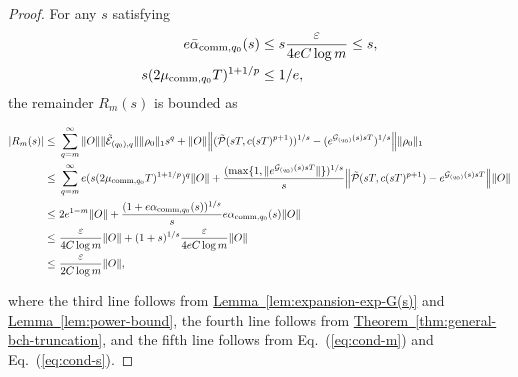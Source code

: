 \documentclass[aps,pra,reprint,groupedaddress,floatfix]{revtex4-2}
\newcommand{\eq}[1]{(\ref{eq:#1})}
\newcommand{\thm}[1]{\hyperref[thm:#1]{Theorem~\ref*{thm:#1}}}
\newcommand{\lem}[1]{\hyperref[lem:#1]{Lemma~\ref*{lem:#1}}}
\newcommand{\G}{\mathcal{G}}
\newcommand{\E}{\mathcal{E}}
\newcommand{\eps}{\varepsilon}
\newcommand{\mc}{\mathcal}
\begin{document}
\begin{proof}
   
    For any $s$ satisfying \begin{align}
    \label{eq:cond-s}
        e\bar\alpha_{\mathrm{comm},q_0}(s)
        &\le s\frac{\eps}{4eC \log m} \le s, \notag\\
        s(2\mu_{\mathrm{comm},q_0}T)^{1+1/p}
        &\le 1/e,
    \end{align} the remainder $R_m(s)$ is bounded as
    \begin{widetext}
    \begin{align*}
        |R_m(s)|\le ~&\sum_{q=m}^{\infty}\|O\|\|\tilde{\E}_{(q_0),q}\|\|\rho_0\|_1 s^q+\|O\|\Big\|(\tilde{\mc P}(sT, c(sT)^{p+1}))^{1/s}
        -(e^{\G_{(q_0)}(s)sT})^{1/s}\Big\|\|\rho_0\|_1 \\
        \le ~& \sum_{q=m}^{\infty} e(s(2\mu_{\mathrm{comm},q_0} T)^{1+1/p})^{q}\|O\| +\frac{(\max\{1, \|e^{\G_{(q_0)}(s) sT}\|\})^{1/s}}{s}
        \Bigl\|\tilde{\mc P}(sT, c(sT)^{p+1})-e^{\G_{(q_0)}(s)sT}\Bigr\|\|O\|\\
        \le ~&2e^{1-m} \|O\|+\frac{(1+e\alpha_{\mathrm{comm},q_0}(s))^{1/s}}{s}
        e\alpha_{\mathrm{comm},q_0}(s)\|O\| \\
        \le ~& \frac{\eps}{4C\log m} \|O\|
        +(1+s)^{1/s}\frac{\eps}{4eC\log m}\|O\| \\
        \le ~& \frac{\eps}{2C\log m} \|O\|,
    \end{align*}
    \end{widetext}
    where the third line follows from \lem{expansion-exp-G(s)} and \lem{power-bound}, the fourth line follows from 
    \thm{general-bch-truncation}, and the fifth line follows from Eq.~\eq{cond-m} and Eq.~\eq{cond-s}.
    

\end{proof}
\end{document}
